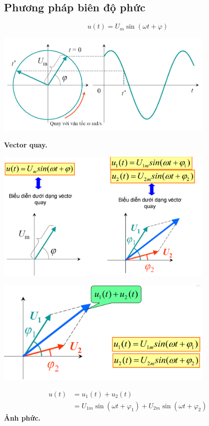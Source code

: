 \subsection{Phương pháp biên độ phức}
\[
    u(t) = U_m \sin (\omega t  + \varphi)
\]
\begin{center}
    \includegraphics[width = 0.8\textwidth]{./image/30.png}
\end{center}
\textbf{Vector quay.}
\begin{center}
    \includegraphics[width = 0.8\textwidth]{./image/31+32.png}
\end{center}
\begin{center}
    \includegraphics[width = 0.8\textwidth]{./image/33.png}
\end{center}
\[
    \begin{aligned}
        u(t) &= u_1(t) + u_2(t)\\
             &= U_{1m}\sin(\omega t + \varphi_1) + U_{2m}\sin(\omega t + \varphi_2)
    \end{aligned}
\]
\textbf{Ảnh phức.}

